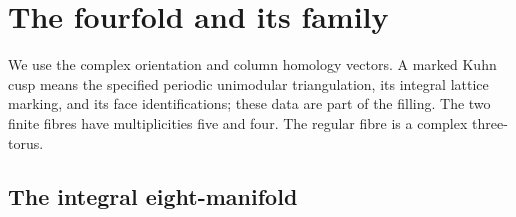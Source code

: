 \section{The fourfold and its family}
\label{sec:V-results}

We use the complex orientation and column homology vectors.  A marked
Kuhn cusp means the specified periodic unimodular triangulation, its
integral lattice marking, and its face identifications; these data are
part of the filling.  The two finite fibres have multiplicities five
and four.  The regular fibre is a complex three-torus.

\subsection{The integral eight-manifold}
\RungOne
